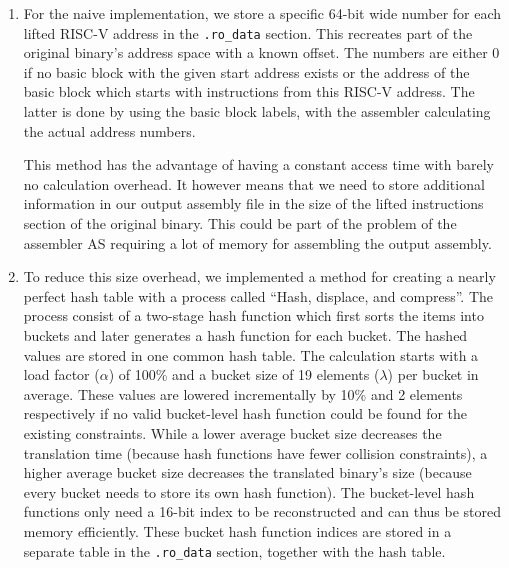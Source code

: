 \documentclass[course=eragp]{aspdoc}
\begin{document}
\begin{enumerate}
    \item For the naive implementation, we store a specific 64-bit wide number for each lifted RISC-V address
          in the \texttt{.ro\_data} section. This recreates part of the original binary's address
          space with a known offset. The numbers are either 0 if no basic block with the given start address
          exists or the address of the basic block which starts with instructions from this RISC-V address.
          The latter is done by using the basic block labels, with the assembler calculating the actual
          address numbers.
          \par
          This method has the advantage of having a constant access time with barely no calculation overhead. It
          however means that we need to store additional information in our output assembly file in the size of the
          lifted instructions section of the original binary. This could be part of the problem of the
          assembler AS requiring a lot of memory for assembling the output assembly.

    \item To reduce this size overhead, we implemented a method for creating a nearly perfect hash table with a
          process called ``Hash, displace, and compress''\cite{CHD}. The process consist of a two-stage hash
          function which first sorts the items into buckets and later generates a hash function for each
          bucket. The hashed values are stored in one common hash table. The calculation starts with a load
          factor ($\alpha$) of 100\% and a bucket size of 19 elements ($\lambda$) per bucket in average. These values are lowered
          incrementally by 10\% and 2 elements respectively if no valid bucket-level hash function could be found for the
          existing constraints.
          While a lower average bucket size decreases the translation time (because hash functions have fewer
          collision constraints), a higher average bucket size decreases the translated binary's size (because
          every bucket needs to store its own hash function).
          The bucket-level hash functions only need a 16-bit index to be reconstructed and can
          thus
          be stored memory efficiently. These bucket hash function indices are stored in a separate table in
          the \texttt{.ro\_data} section, together with the hash table.

          \par


\end{enumerate}
\end{document}
